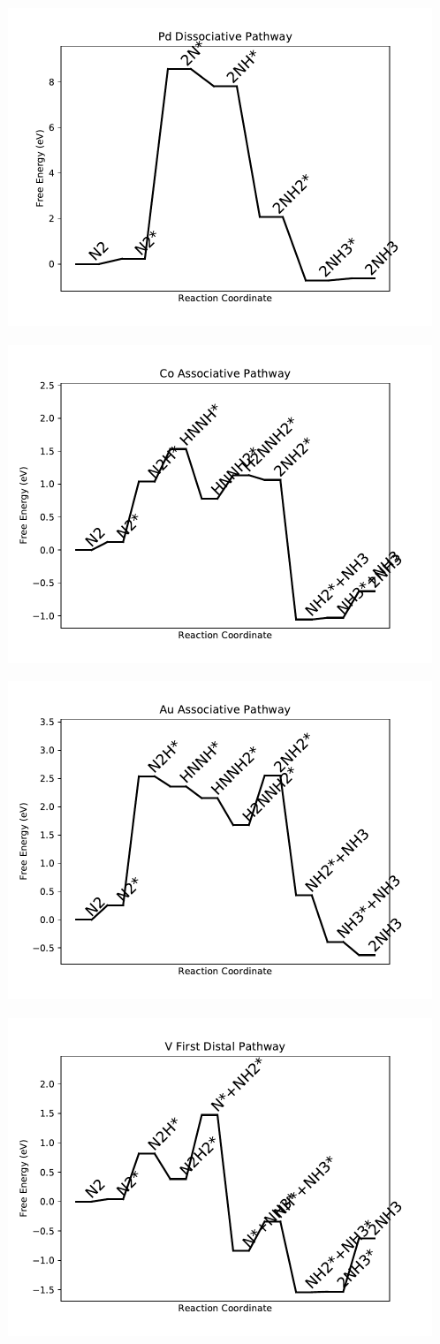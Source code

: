 \documentclass[journal=jacsat,manuscript=article]{achemso}
\begin{document}
\begin{figure}
\includegraphics[width=0.5\linewidth]{data/plots/Pd_dissociative.pdf}
\label{fig:Pd_dissociative}
\end{figure}

\newpage
\begin{figure}
\includegraphics[width=0.5\linewidth]{data/plots/Co_associative.pdf}
\label{fig:Co_associative}
\end{figure}

\begin{figure}
\includegraphics[width=0.5\linewidth]{data/plots/Au_associative.pdf}
\label{fig:Au_associative}
\end{figure}

\newpage
\begin{figure}
\includegraphics[width=0.5\linewidth]{data/plots/V_distal_1.pdf}
\label{fig:V_distal_1}
\end{figure}
\end{document}
